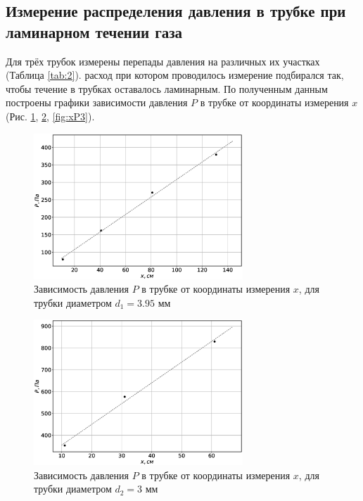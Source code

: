 \documentclass[12pt]{article}
\begin{document}
\subsection*{Измерение распределения давления в трубке при ламинарном течении газа}
Для трёх трубок измерены перепады давления на различных их участках (Таблица \ref{tab:2}). 
расход при котором проводилось измерение подбирался так, чтобы течение в трубках оставалось ламинарным. 
По полученным данным построены графики зависимости давления $P$  в трубке от координаты измерения $x$ (Рис. \ref{fig:xP1}, \ref{fig:xP2}, \ref{fig:xP3}). 
\begin{figure}[H]
    \centering
    \includegraphics[width=0.7\textwidth]{xP1.eps}
    \caption{Зависимость давления $P$ в трубке от координаты измерения $x$, для трубки
        диаметром $d_1 = 3.95$ мм}
    \label{fig:xP1}
\end{figure}
\begin{figure}[H]
    \centering
    \includegraphics[width=0.7\textwidth]{xP2.eps}
    \caption{Зависимость давления $P$ в трубке от координаты измерения $x$, для трубки
        диаметром $d_2 = 3$ мм}
    \label{fig:xP2}
\end{figure}
\end{document}
